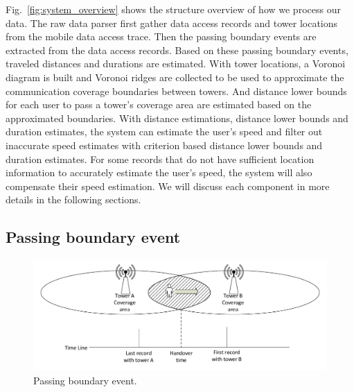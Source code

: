Fig.~\ref{fig:system_overview} shows the structure overview of how we process our data. The raw data parser first gather data access records and tower locations from the mobile data access trace. Then the passing boundary events are extracted from the data access records. Based on these passing boundary events, traveled distances and durations are estimated. With tower locations, a Voronoi diagram is built and Voronoi ridges are collected to be used to approximate the communication coverage boundaries between towers. And distance lower bounds for each user to pass a tower's coverage area are estimated based on the approximated boundaries. With distance estimations, distance lower bounds and duration estimates, the system can estimate the user's speed and filter out inaccurate speed estimates with criterion based distance lower bounds and duration estimates. For some records that do not have sufficient location information to accurately estimate the user's speed, the system will also compensate their speed estimation. We will discuss each component in more details in the following sections.

\subsection{Passing boundary event}

\begin{figure}[h]
    \centering
    \includegraphics[width=\linewidth]{./figures/passing_boundary.pdf}
    \caption{Passing boundary event.}
    \label{fig:pass_bound}
\end{figure}

